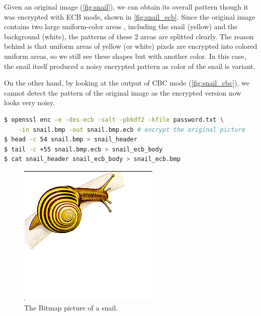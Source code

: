 Given an original image (\autoref{fig:snail}), we can obtain its
overall pattern though it was encrypted with ECB mode, shown in
\autoref{fig:snail_ecb}.
Since the original image contains two large uniform-color areas
, including the snail (yellow) and the background (white), the patterns of these
2 areas are splitted clearly. The reason behind is that uniform areas of
yellow (or white) pixels are encrypted into colored uniform areas, so
we still see these shapes but with another color. In this case, the snail
itself produced a noisy encrypted pattern as color of the snail is variant.

On the other hand, by looking at the output of CBC mode
(\autoref{fig:snail_cbc}),
we cannot detect the pattern of the original image as the encrypted
version now looks very noisy.

\begin{lstlisting}[language=Bash, caption=Commands generating
    {\fontfamily{qcr}\selectfont snail\_ecb.bmp}, label={
        lst:snail_ecb
    }]
$ openssl enc -e -des-ecb -salt -pbkdf2 -kfile password.txt \
    -in snail.bmp -out snail.bmp.ecb # encrypt the original picture
$ head -c 54 snail.bmp > snail_header
$ tail -c +55 snail.bmp.ecb > snail_ecb_body
$ cat snail_header snail_ecb_body > snail_ecb.bmp
\end{lstlisting}

\begin{figure}
    \centering
    \includegraphics[height=\textheight,width=\textwidth,keepaspectratio]
    {figures/snail.png}
    \caption{The Bitmap picture of a snail.}\label{fig:snail}
\end{figure}

